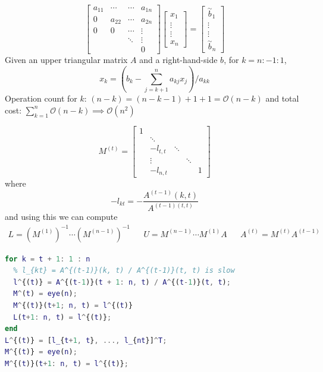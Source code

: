\documentclass[12pt]{scrartcl}
\begin{document}
\begin{definition}
\begin{enumerate}
    \[\begin{bmatrix}
      a_{11} & \cdots & \cdots & a_{1n}\\
      0  & a_{22} & \cdots & a_{2n}\\
      0 & 0 & \cdots & \vdots\\
      & & \ddots & \vdots\\
      & & & 0
    \end{bmatrix}\begin{bmatrix}
      x_1\\ \vdots  \\ \vdots\\ x_n
    \end{bmatrix} = \begin{bmatrix}
      \overset{\sim}{b}_1 \\ \vdots \\ \vdots \\ \overset{\sim}{b}_n
    \end{bmatrix}\]
    Given an upper triangular matrix $A$ and a right-hand-side $b$,  for $k = n: -1: 1$, 
    \[x_k = (b_k - \sum_{j=k+1}^n a_{kj}x_j) / a_{kk}\]
    Operation count for $k$: $(n-k) = (n-k-1) + 1 + 1 = \mathcal{O}(n-k)$ and total cost: $\sum_{k=1}^n \mathcal{O}(n-k) \implies \mathcal{O}(n^2)$
  \end{enumerate}
\end{definition}

\begin{definition}[LU Facotorization]
  \[M^{(t)} = \begin{bmatrix}
    1\\
    & \ddots \\
    & -l_{t, t} & \ddots\\
    & \vdots & & \ddots\\
    & -l_{n, t} & & &  1
  \end{bmatrix}\]
  where 
  \[-l_{kt} = -\frac{A^{(t-1)}(k, t)}{A^{(t-1)(t, t)}}\]
  and using this we can compute 
  \begin{align*}
    L = (M^{(1)})^{-1} \cdots (M^{(n-1)})^{-1} && U = M^{(n-1)} \cdots M^{(1)}A && A^{(t)} = M^{(t)}A^{(t-1)}
  \end{align*}
  \begin{lstlisting}[language=Matlab]
for k = t + 1: 1 : n
  % l_{kt} = A^{(t-1)}(k, t) / A^{(t-1)}(t, t) is slow
  l^{(t)} = A^{(t-1)}(t + 1: n, t) / A^{(t-1)}(t, t);
  M^(t) = eye(n);
  M^{(t)}(t+1; n, t) = l^{(t)}
  L(t+1: n, t) = l^{(t)};
end
L^{(t)} = [l_{t+1, t}, ..., l_{nt}]^T;
M^{(t)} = eye(n);
M^{(t)}(t+1: n, t) = l^{(t)};
  \end{lstlisting}
\end{definition}
\end{document}
